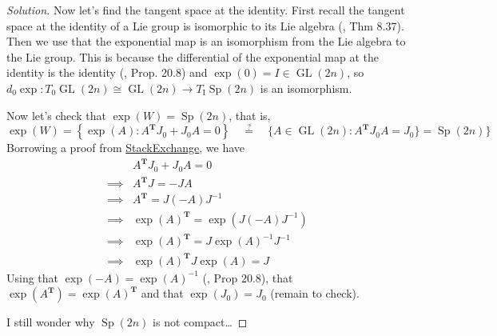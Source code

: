 \begin{proof}[Solution]
Now let's find the tangent space at the identity. First recall the tangent space at the identity of a Lie group is isomorphic to its Lie algebra (\cite{lee}, Thm 8.37). Then we use that the exponential map is an isomorphism from the Lie algebra to the Lie group. This is because the differential of the exponential map at the identity is the identity (\cite{lee}, Prop. 20.8) and $\operatorname{exp}(0) =I\in\operatorname{GL}(2n)$, so $d_0\operatorname{exp}: T_0\operatorname{GL}(2n)\cong \operatorname{GL}(2n)\to T_{\operatorname{I}}\operatorname{Sp}(2n)$ is an isomorphism.

Now let's check that $\operatorname{exp}(W) =\operatorname{Sp}(2n)$, that is,
\[\operatorname{exp}(W) = \left\{ \operatorname{exp}(A):A^{\mathbf{T}}J_0+J_0A=0 \right\}\quad \overset{?}{=}\quad \{A\in\operatorname{GL}(2n):A^{\mathbf{T}}J_0A=J_0\}=\operatorname{Sp}(2n) \}\]
Borrowing a proof from \href{https://math.stackexchange.com/questions/445088/finding-the-lie-algebra-of-the-symplectic-lie-group}{StackExchange}, we have
\begin{align*}
	&A^{\mathbf{T}}J_0+J_0A =0\\
	\implies & A^{\mathbf{T}} J=-JA\\
	\implies & A^{\mathbf{T}} =J(-A)J^{-1}\\
	\implies &\operatorname{exp}(A)^{\mathbf{T}}=\operatorname{exp}(J(-A) J^{-1})\\
	\implies &\operatorname{exp}(A)^{\mathbf{T}} =J\operatorname{exp}(A)^{-1}J^{-1}\\
	\implies &\operatorname{exp}(A)^{\mathbf{T}} J\operatorname{exp}(A) =J
\end{align*}
Using that $\operatorname{exp}(-A) =\operatorname{exp}(A)^{-1}$ (\cite{lee}, Prop 20.8), that $\operatorname{exp}(A^{\mathbf{T}}) =\operatorname{exp}(A)^{\mathbf{T}}$ and that $\operatorname{exp}(J_0) =J_0$ (remain to check).

I still wonder why $\operatorname{Sp}(2n)$ is not compact…

\end{proof}

